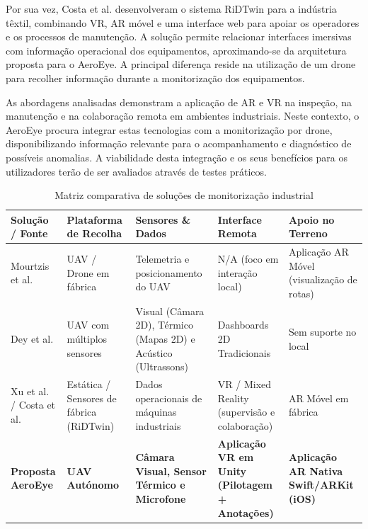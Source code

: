 \documentclass[conference,a4paper]{IEEEtran}
\begin{document}
Por sua vez, Costa et al. \cite{repec:gam:jftint:v:18:y:2026:i:6:p:330-:d:1969785} desenvolveram o sistema RiDTwin para a indústria têxtil, combinando VR, AR móvel e uma interface web para apoiar os operadores e os processos de manutenção. A solução permite relacionar interfaces imersivas com informação operacional dos equipamentos, aproximando-se da arquitetura proposta para o AeroEye. A principal diferença reside na utilização de um drone para recolher informação durante a monitorização dos equipamentos.

As abordagens analisadas demonstram a aplicação de AR e VR na inspeção, na manutenção e na colaboração remota em ambientes industriais. Neste contexto, o AeroEye procura integrar estas tecnologias com a monitorização por drone, disponibilizando informação relevante para o acompanhamento e diagnóstico de possíveis anomalias. A viabilidade desta integração e os seus benefícios para os utilizadores terão de ser avaliados através de testes práticos.

\begin{table}[!t]
\caption{Matriz comparativa de soluções de monitorização industrial}
\label{tab:comparacao_solucoes}
\centering
\footnotesize
\setlength{\tabcolsep}{4pt}
\renewcommand{\arraystretch}{1.18}
\begin{tabular}{|>{\raggedright\arraybackslash}p{}|>{\raggedright\arraybackslash}p{}|>{\raggedright\arraybackslash}p{}|>{\raggedright\arraybackslash}p{}|>{\raggedright\arraybackslash}p{}|}
\hline
\textbf{Solução / Fonte} & \textbf{Plataforma de Recolha} & \textbf{Sensores \& Dados} & \textbf{Interface Remota} & \textbf{Apoio no Terreno} \\ \hline
Mourtzis et al. \cite{Mourtzis02052024} & UAV / Drone em fábrica & Telemetria e posicionamento do UAV & N/A (foco em interação local) & Aplicação AR Móvel (visualização de rotas) \\ \hline
Dey et al. \cite{Dey2026} & UAV com múltiplos sensores & Visual (Câmara 2D), Térmico (Mapas 2D) e Acústico (Ultrassons) & Dashboards 2D Tradicionais & Sem suporte no local \\ \hline
Xu et al. \cite{11355682} / Costa et al. \cite{repec:gam:jftint:v:18:y:2026:i:6:p:330-:d:1969785} & Estática / Sensores de fábrica (RiDTwin) & Dados operacionais de máquinas industriais & VR / Mixed Reality (supervisão e colaboração) & AR Móvel em fábrica \\ \hline
\textbf{Proposta AeroEye} & \textbf{UAV Autónomo} & \textbf{Câmara Visual, Sensor Térmico e Microfone} & \textbf{Aplicação VR em Unity (Pilotagem + Anotações)} & \textbf{Aplicação AR Nativa Swift/ARKit (iOS)} \\ \hline
\end{tabular}
\end{table}
\end{document}
